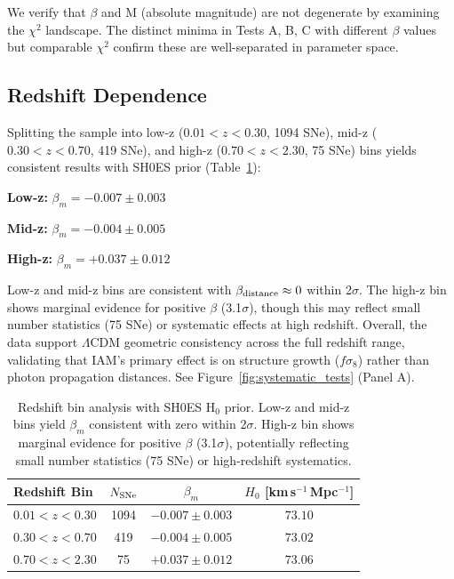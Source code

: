 \documentclass[twocolumn,superscriptaddress,prd,amsmath,amssymb]{revtex4-2}
\begin{document}
We verify that $\beta$ and M (absolute magnitude) are not degenerate by examining the $\chi^2$ landscape. The distinct minima in Tests A, B, C with different $\beta$ values but comparable $\chi^2$ confirm these are well-separated in parameter space.

\subsection{Redshift Dependence}

Splitting the sample into low-z ($0.01 < z < 0.30$, 1094 SNe), 
mid-z ($0.30 < z < 0.70$, 419 SNe), and high-z 
($0.70 < z < 2.30$, 75 SNe) bins yields consistent 
results with SH0ES prior (Table~\ref{tab:redshift_bins}):

\textbf{Low-z:} $\beta_m = -0.007 \pm 0.003$

\textbf{Mid-z:} $\beta_m = -0.004 \pm 0.005$

\textbf{High-z:} $\beta_m = +0.037 \pm 0.012$

Low-z and mid-z bins are consistent with $\beta_{\rm distance} \approx 0$ 
within 2$\sigma$. The high-z bin shows marginal evidence for positive 
$\beta$ (3.1$\sigma$), though this may reflect small number statistics 
(75 SNe) or systematic effects at high redshift. Overall, the data 
support $\Lambda$CDM geometric consistency across the full redshift range, 
validating that IAM's primary effect is on structure growth ($f\sigma_8$) 
rather than photon propagation distances. See Figure~\ref{fig:systematic_tests} (Panel A).

\begin{table}[h]
\centering
\begin{tabular}{lccc}
\hline\hline
Redshift Bin & $N_{\rm SNe}$ & $\beta_m$ & $H_0$ [km\,s$^{-1}$\,Mpc$^{-1}$] \\
\hline
$0.01 < z < 0.30$         &   1094 & $-0.007 \pm 0.003$   & $73.10$ \\
$0.30 < z < 0.70$         &    419 & $-0.004 \pm 0.005$   & $73.02$ \\
$0.70 < z < 2.30$         &     75 & $+0.037 \pm 0.012$   & $73.06$ \\
\hline\hline
\end{tabular}
\caption{Redshift bin analysis with SH0ES H$_0$ prior. Low-z and mid-z 
bins yield $\beta_m$ consistent with zero within 2$\sigma$. High-z bin 
shows marginal evidence for positive $\beta$ (3.1$\sigma$), potentially 
reflecting small number statistics (75 SNe) or high-redshift systematics.}
\label{tab:redshift_bins}
\end{table}
\end{document}
